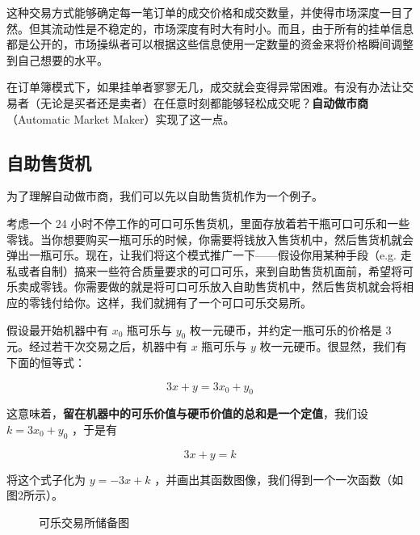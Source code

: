 \documentclass[12pt, a4paper, oneside]{ctexart}
\begin{document}
这种交易方式能够确定每一笔订单的成交价格和成交数量，并使得市场深度一目了然。但其流动性是不稳定的，市场深度有时大有时小。而且，由于所有的挂单信息都是公开的，市场操纵者可以根据这些信息使用一定数量的资金来将价格瞬间调整到自己想要的水平。

在订单簿模式下，如果挂单者寥寥无几，成交就会变得异常困难。有没有办法让交易者（无论是买者还是卖者）在任意时刻都能够轻松成交呢？\textbf{自动做市商}（Automatic Market Maker）实现了这一点。

\subsection{自助售货机}

为了理解自动做市商，我们可以先以自助售货机作为一个例子。

考虑一个 24 小时不停工作的可口可乐售货机，里面存放着若干瓶可口可乐和一些零钱。当你想要购买一瓶可乐的时候，你需要将钱放入售货机中，然后售货机就会弹出一瓶可乐。现在，让我们将这个模式推广一下——假设你用某种手段（e.g. 走私或者自制）搞来一些符合质量要求的可口可乐，来到自助售货机面前，希望将可乐卖成零钱。你需要做的就是将可口可乐放入自助售货机中，然后售货机就会将相应的零钱付给你。这样，我们就拥有了一个可口可乐交易所。

假设最开始机器中有 $x_0$ 瓶可乐与 $y_0$ 枚一元硬币，并约定一瓶可乐的价格是 3 元。经过若干次交易之后，机器中有 $x$ 瓶可乐与 $y$ 枚一元硬币。很显然，我们有下面的恒等式：

\begin{equation}
    3x + y = 3x_0 + y_0
\end{equation}

\noindent 这意味着，\textbf{留在机器中的可乐价值与硬币价值的总和是一个定值}，我们设 $k=3x_0+y_0$ ，于是有

\begin{equation}
    3x + y = k
\end{equation}

\noindent 将这个式子化为 $y = -3x + k$ ，并画出其函数图像，我们得到一个一次函数（如图2所示）。

\begin{figure}[htbp]
    \centering
    \caption{可乐交易所储备图}
\end{figure}
\end{document}
